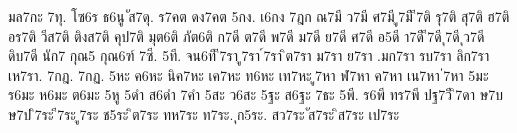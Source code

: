 {มล7กะ
7ทุ.
โซ6ร
ธ6นู
ัส7ดุ.
ร7คต
ดง7คต
5กง.
เ6กง
7ฎก
ณ7มี
ว7มี
ศ7มี
ู7มี
ี7ติ
รุ7ติ
สุ7ติ
ฮ7ติ
อร7ติ
วีส7ติ
ติงส7ติ
คุป7ติ
มุต6ติ
ภัต6ติ
ก7ดี
ต7ดี
พ7ดี
ม7ดี
ย7ดี
ศ7ดี
อ5ดี
า7ดี
ี7ดี
ุ7ดี
ุว7ดี
ดิบ7ดี
นัก7
กุณ5
กุณ6ฑ์
7ซี.
5ที.
จน6ที
ี7รา
ู7รา
์7รา
ิต7รา
ม7รา
ย7รา
.มก7รา
รบ7รา
ลิก7รา
เห7รา.
7กฎ.
7กฏ.
5หะ
ค6หะ
นิค7หะ
เค7หะ
ท6หะ
เท7หะ
ู7หา
ฬ7หา
ค7หา
เน7หา
่7หา
5มะ
ร6มะ
ห6มะ
ต6มะ
5หู
5ดำ
ส6ดำ
7คำ
5สะ
ว6สะ
5ฐะ
ส6ฐะ
7ธะ
5พี.
ร6พี
ทร7พี
ปฐ7วี
ิ7ดา
ษ7บ
ษ7ป
ิ7ระ
ี7ระ
ู7ระ
ช5ระ
ิต7ระ
ทห7ระ
ท7ระ.
ุก5ระ.
สว7ระ
ัส7ระ
ิส7ระ
เป7ระ
}
